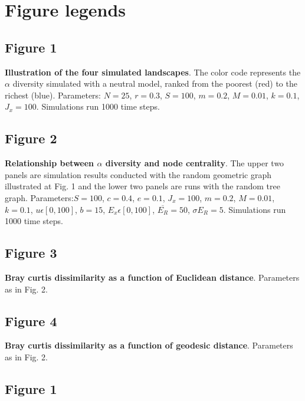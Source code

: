 \documentclass[12pt]{article}
\begin{document}
\printbibliography

\newpage
\section*{Figure legends}

\subsection*{Figure 1}
\textbf{Illustration of the four simulated landscapes}. The color code
represents the $\alpha$ diversity simulated with a neutral model, ranked from
the poorest (red) to the richest (blue). Parameters: $N = 25$, $r = 0.3 $, $S =
100$, $m = 0.2$, $M = 0.01$, $k = 0.1$, $J_x = 100$. Simulations run 1000 time
steps.

\subsection*{Figure 2}
\textbf{Relationship between $\alpha$ diversity and node centrality}. The upper
two panels are simulation results conducted with the random geometric graph
illustrated at Fig. 1 and the lower two panels are runs with the random tree
graph. Parameters:$S = 100$, $c = 0.4$, $e = 0.1$, $J_x = 100$, $m = 0.2$, $M =
0.01$, $k = 0.1$, $ u \epsilon [0,100]$, $b = 15$, $ E_x \epsilon [0,100]$,
$\overline{E_R} = 50$, $\sigma{E_R} = 5$. Simulations run 1000 time steps.

\subsection*{Figure 3}
\textbf{Bray curtis dissimilarity as a function of Euclidean distance}. Parameters as in Fig. 2.

\subsection*{Figure 4}
\textbf{Bray curtis dissimilarity as a function of geodesic distance}. Parameters as in Fig. 2.

\newpage
\subsection*{Figure 1}
\end{document}
